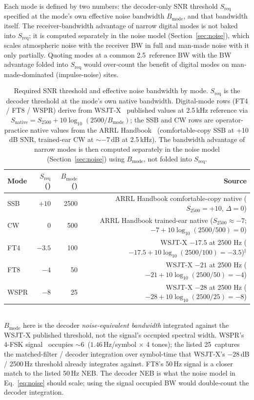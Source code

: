 \documentclass[11pt,a4paper]{article}
\newcommand{\SI}[2]{#1\,\text{#2}}
\newcommand{\si}[1]{\text{#1}}
\newcommand{\dB}{\text{dB}}
\newcommand{\kHz}{\text{kHz}}
\newcommand{\Hz}{\text{Hz}}
\begin{document}
Each mode is defined by two numbers: the decoder-only SNR threshold
$S_{\text{req}}$ specified at the mode's own effective noise bandwidth
$B_{\text{mode}}$, and that bandwidth itself.  The receiver-bandwidth
advantage of narrow digital modes is not baked into $S_{\text{req}}$;
it is computed separately in the noise model (Section~\ref{sec:noise}),
which scales atmospheric noise with the receiver BW in full and
man-made noise with it only partially.  Quoting modes at a common
\SI{2.5}{\kHz} reference BW with the BW advantage folded into
$S_{\text{req}}$ would over-count the benefit of digital modes on
man-made-dominated (impulse-noise) sites.

\begin{table}[H]
\centering
\caption{Required SNR threshold and effective noise bandwidth by
         mode.  $S_{\text{req}}$ is the decoder threshold at the
         mode's own native bandwidth.  Digital-mode rows (FT4 /
         FT8 / WSPR) derive from WSJT-X~\cite{k1jt} published
         values at 2.5\,kHz reference via
         $S_{\text{native}} = S_{2500} + 10\log_{10}(2500 / B_{\text{mode}})$;
         the SSB and CW rows are operator-practice native values
         from the ARRL
         Handbook~\cite{arrl2023handbook} (comfortable-copy SSB
         at +10\,dB SNR, trained-ear CW at $\sim$$-7$\,dB at
         2.5\,kHz).  The bandwidth advantage of narrow modes is
         then computed separately in the noise model
         (Section~\ref{sec:noise}) using $B_{\text{mode}}$, not
         folded into $S_{\text{req}}$.}
\label{tab:modesnr}
\begin{tabular}{@{}lrrr@{}}
\toprule
\textbf{Mode} & {$S_{\text{req}}$ (\si{\dB})} & {$B_{\text{mode}}$ (\si{\Hz})} & {Source} \\
\midrule
SSB  & $+10$ &  2500 & ARRL Handbook comfortable-copy native ($S_{2500} = +10$, $\Delta = 0$) \\
CW   &  $0$  &   500 & ARRL Handbook trained-ear native ($S_{2500} \approx -7$; $-7 + 10\log_{10}(2500/500) = 0$) \\
FT4  & $-3.5$ &  100 & WSJT-X $-17.5$ at 2500 Hz ($-17.5 + 10\log_{10}(2500/100) = -3.5$)$^{\ddagger}$ \\
FT8  & $-4$  &    50 & WSJT-X $-21$ at 2500 Hz ($-21 + 10\log_{10}(2500/50) = -4$) \\
WSPR & $-8$  &    25 & WSJT-X $-28$ at 2500 Hz ($-28 + 10\log_{10}(2500/25) = -8$) \\
\bottomrule
\end{tabular}\\[4pt]
\footnotesize
$B_{\text{mode}}$ here is the decoder \emph{noise-equivalent
bandwidth} integrated against the WSJT-X published threshold,
not the signal's occupied spectral width.  WSPR's 4-FSK
signal~\cite{wsprnet} occupies $\sim$\SI{6}{\Hz} ($1.46$\,Hz/symbol $\times$ 4 tones);
the listed \SI{25}{\Hz} captures the matched-filter / decoder
integration over symbol-time that WSJT-X's $-28$\,dB / 2500\,Hz
threshold already integrates against.  FT8's 50\,Hz signal is a
closer match to the listed 50\,Hz NEB.  The decoder NEB is what
the noise model in Eq.~\ref{eq:noise} should scale; using the
signal occupied BW would double-count the decoder integration.


\end{table}
\end{document}
